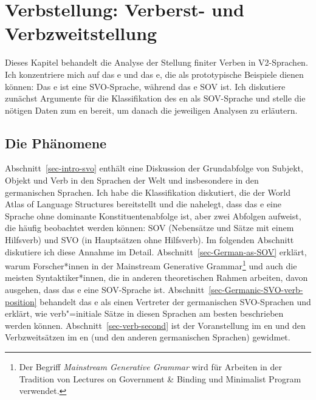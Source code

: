 \chapter{Verbstellung: Verberst- und Verbzweitstellung}
\label{chap-verb-position}

Dieses Kapitel behandelt die Analyse der Stellung finiter Verben in V2-Sprachen. Ich konzentriere mich auf
das e und das e, die als prototypische Beispiele dienen können: Das e ist eine SVO-Sprache, während das e
SOV ist. Ich diskutiere zunächst Argumente für die Klassifikation des en als SOV-Sprache und
stelle die nötigen Daten zum en bereit, um danach die jeweiligen Analysen zu erläutern.

\section{Die Phänomene}

Abschnitt~\ref{sec-intro-svo} enthält eine Diskussion der Grundabfolge von Subjekt, Objekt und Verb in den Sprachen
der Welt und insbesondere in den germanischen Sprachen. Ich habe die Klassifikation diskutiert, die
der World Atlas of Language Structures \citep{Dryer2013a} bereitstellt und die nahelegt, dass das e eine Sprache ohne dominante
Konstituentenabfolge ist, aber zwei Abfolgen aufweist, die häufig beobachtet werden können: SOV (Nebensätze und
Sätze mit einem Hilfsverb) und SVO (in Hauptsätzen ohne Hilfsverb).
Im folgenden Abschnitt diskutiere ich diese
Annahme im Detail. Abschnitt~\ref{sec-German-as-SOV} erklärt, warum Forscher*innen in der
Mainstream Generative Grammar\footnote{
  Der Begriff \emph{Mainstream Generative Grammar} wird für Arbeiten in der Tradition von
  Lectures on Government \& Binding \citep{Chomsky81a} und Minimalist Program \citep{Chomsky95a-u}
  verwendet.
} und auch die meisten Syntaktiker*innen, die in anderen theoretischen Rahmen arbeiten, davon ausgehen,
dass das e eine SOV-Sprache ist. Abschnitt~\ref{sec-Germanic-SVO-verb-position} behandelt das e als
einen Vertreter der germanischen SVO-Sprachen und erklärt, wie verb"=initiale Sätze in diesen Sprachen
am besten beschrieben werden können. Abschnitt~\ref{sec-verb-second} ist der Voranstellung im en und
den Verbzweitsätzen im en (und den anderen germanischen Sprachen) gewidmet.

